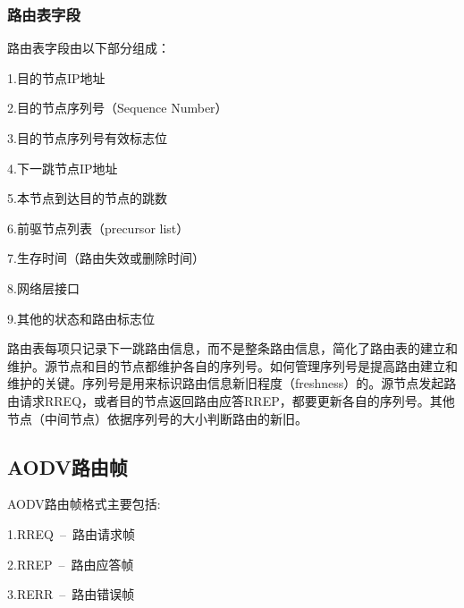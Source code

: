\documentclass[a4paper]{article}
\begin{document}
\subsubsection{路由表字段}
路由表字段由以下部分组成：

1.目的节点IP地址

2.目的节点序列号（Sequence Number）

3.目的节点序列号有效标志位

4.下一跳节点IP地址

5.本节点到达目的节点的跳数

6.前驱节点列表（precursor list）

7.生存时间（路由失效或删除时间）

8.网络层接口

9.其他的状态和路由标志位

路由表每项只记录下一跳路由信息，而不是整条路由信息，简化了路由表的建立和维护。源节点和目的节点都维护各自的序列号。如何管理序列号是提高路由建立和维护的关键。序列号是用来标识路由信息新旧程度（freshness）的。源节点发起路由请求RREQ，或者目的节点返回路由应答RREP，都要更新各自的序列号。其他节点（中间节点）依据序列号的大小判断路由的新旧。
\subsection{AODV路由帧}
AODV路由帧格式主要包括:

1.RREQ\ –\ 路由请求帧

2.RREP\ –\ 路由应答帧

3.RERR\ –\ 路由错误帧
\end{document}
